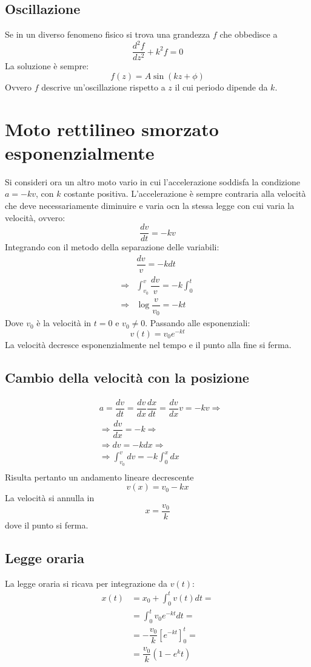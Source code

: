 \documentclass[class=book, crop=false, oneside, 12pt]{standalone}
\begin{document}
	\subsection{Oscillazione}
	Se in un diverso fenomeno fisico si trova una grandezza $f$ che obbedisce a
	$$\dfrac{d^2f}{dz^2}+k^2f=0$$
	La soluzione \`e sempre:
	$$f(z)=A\sin(kz+\phi)$$
	Ovvero $f$ descrive un'oscillazione rispetto a $z$ il cui periodo dipende da $k$.
\section{Moto rettilineo smorzato esponenzialmente}
Si consideri ora un altro moto vario in cui l'accelerazione soddisfa la condizione $a = -kv$, con $k$ costante positiva.
L'accelerazione \`e sempre contraria alla velocit\`a che deve necessariamente diminuire e varia ocn la stessa legge con cui varia la velocit\`a, ovvero:
$$\dfrac{dv}{dt} = -kv$$
Integrando con il metodo della separazione delle variabili:
\begin{align*}
	&\dfrac{dv}{v} = -kdt\\
	\Rightarrow&\int_{v_0}^v\dfrac{dv}{v} = -k\int_0^t\\
	\Rightarrow &\log\dfrac{v}{v_0} = -kt
\end{align*}
Dove $v_0$ \`e la velocit\`a in $t=0$ e $v_0\neq 0$.
Passando alle esponenziali:
$$v(t) = v_0e^{-kt}$$
La velocit\`a decresce esponenzialmente nel tempo e il punto alla fine si ferma.
	\subsection{Cambio della velocit\`a con la posizione}
	\begin{align*}
		&a = \dfrac{dv}{dt}=\dfrac{dv}{dx}\dfrac{dx}{dt}=\dfrac{dv}{dx}v = -kv\Rightarrow\\
		&\Rightarrow \dfrac{dv}{dx}=-k\Rightarrow\\
		&\Rightarrow dv = -kdx\Rightarrow\\
		&\Rightarrow \int_{v_0}^v dv = -k \int_0^xdx\\
	\end{align*}
	Risulta pertanto un andamento lineare decrescente
	$$v(x)=v_0-kx$$
	La velocit\`a si annulla in
	$$x=\dfrac{v_0}{k}$$
	dove il punto si ferma.
	\subsection{Legge oraria}
	La legge oraria si ricava per integrazione da $v(t)$:
	\begin{align*}
		x(t)&=x_0+\int_0^t v(t)dt=\\
		    &=\int_0^tv_0e^{-kt}dt=\\
				&=-\dfrac{v_0}{k}[e^{-kt}]_0^t=\\
				&=\dfrac{v_0}{k}(1-e^kt)
	\end{align*}
\end{document}
